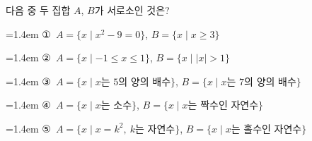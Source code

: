 다음 중 두 집합 $A$, $B$가 서로소인 것은?
\par\medskip\par\noindent\hangindent=1.4em {\small ①}\ $A=\{x \mid x^2-9=0\}$, $B=\{x \mid x\ge 3\}$\par\noindent\hangindent=1.4em {\small ②}\ $A=\{x \mid -1\le x\le 1\}$, $B=\{x \mid |x|>1\}$\par\noindent\hangindent=1.4em {\small ③}\ $A=\{x \mid x$는 $5$의 양의 배수$\}$, $B=\{x \mid x$는 $7$의 양의 배수$\}$\par\noindent\hangindent=1.4em {\small ④}\ $A=\{x \mid x$는 소수$\}$, $B=\{x \mid x$는 짝수인 자연수$\}$\par\noindent\hangindent=1.4em {\small ⑤}\ $A=\{x \mid x=k^2,\ k$는 자연수$\}$, $B=\{x \mid x$는 홀수인 자연수$\}$\par\medskip
